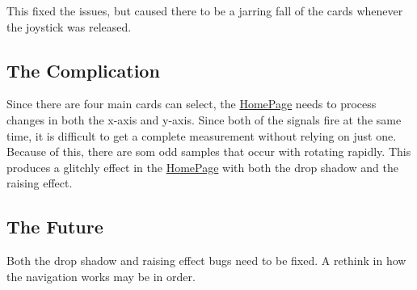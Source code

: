This fixed the issues, but caused there to be a jarring fall of the cards whenever the joystick was released.

\subsection*{The Complication}

Since there are four main cards can select, the \mbox{\hyperlink{classHomePage}{Home\+Page}} needs to process changes in both the x-\/axis and y-\/axis. Since both of the signals fire at the same time, it is difficult to get a complete measurement without relying on just one. Because of this, there are som odd samples that occur with rotating rapidly. This produces a glitchly effect in the \mbox{\hyperlink{classHomePage}{Home\+Page}} with both the drop shadow and the raising effect.

\subsection*{The Future}

Both the drop shadow and raising effect bugs need to be fixed. A rethink in how the navigation works may be in order. 